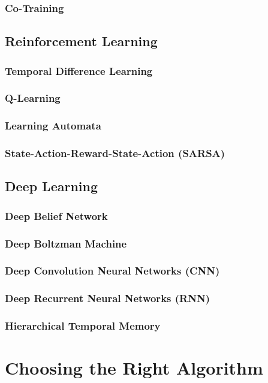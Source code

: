 \documentclass{report}
\begin{document}
	\subsection{Co-Training}

\section{Reinforcement Learning}

	\subsection{Temporal Difference Learning}

	\subsection{Q-Learning}

	\subsection{Learning Automata}

	\subsection{State-Action-Reward-State-Action (SARSA)}

\section{Deep Learning}

	\subsection{Deep Belief Network}

	\subsection{Deep Boltzman Machine}

	\subsection{Deep Convolution Neural Networks (CNN)}

	\subsection{Deep Recurrent Neural Networks (RNN)}

	\subsection{Hierarchical Temporal Memory}
	
\chapter{Choosing the Right Algorithm}
\end{document}

